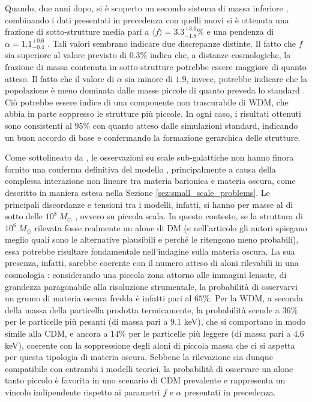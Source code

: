 Quando, due anni dopo, si è scoperto un secondo sistema di massa inferiore \parencite{Vegetti2012}, combinando i dati presentati in precedenza con quelli nuovi si è ottenuta una frazione di sotto-strutture media pari a $\langle f \rangle = 3.3^{+3.6}_{-1.8} \%$  e una pendenza di  $\alpha=1.1^{+0.6}_{-0.4}$ . Tali valori sembrano indicare due discrepanze distinte. Il fatto che $f$ sia superiore al valore previsto di $0.3\%$ indica che, a distanze cosmologiche, la frazione di massa contenuta in sotto-strutture potrebbe essere maggiore di quanto atteso. Il fatto che il valore di $\alpha$ sia minore di $1.9$, invece, potrebbe indicare che la popolazione è meno dominata dalle masse piccole di quanto preveda lo standard \LCDM. Ciò potrebbe essere indice di una componente non trascurabile di WDM, che abbia in parte soppresso le strutture più piccole. In ogni caso, i risultati ottenuti sono consistenti al 95\% con quanto atteso dalle simulazioni standard, indicando un buon accordo di base e confermando la formazione gerarchica delle strutture.

Come sottolineato da \textcite{Powell2025}, le osservazioni su scale sub-galattiche non hanno finora fornito una conferma definitiva del modello \LCDM, principalmente a causa della complessa interazione non lineare tra materia barionica e materia oscura, come descritto in maniera estesa nella Sezione \ref{sez:small_scale_problems}.
Le principali discordanze e tensioni tra i modelli, infatti, si hanno per masse al di sotto delle $10^8\ M_\odot$ , ovvero su piccola scala. In questo contesto, se la struttura di $10^6\ M_\odot$ rilevata fosse realmente un alone di DM (e nell'articolo gli autori spiegano meglio quali sono le alternative plausibili e perché le ritengono meno probabili), essa potrebbe risultare fondamentale nell'indagine sulla materia oscura.
La sua presenza, infatti, sarebbe coerente con il numero atteso di aloni rilevabili in una cosmologia \LCDM: considerando una piccola zona attorno alle immagini lensate, di grandezza paragonabile alla risoluzione strumentale, la probabilità di osservarvi un grumo di materia oscura fredda è infatti pari al $65\%$. Per la WDM, a seconda della massa della particella prodotta termicamente, la probabilità scende a $36\%$ per le particelle più pesanti (di massa pari a $9.1$ keV), che si comportano in modo simile alla CDM, e ancora a $14\%$ per le particelle più leggere (di massa pari a $4.6$ keV), coerente con la  soppressione degli aloni di piccola massa che ci si aspetta per questa tipologia di materia oscura. Sebbene la rilevazione sia dunque compatibile con entrambi i modelli teorici, la probabilità di osservare un alone tanto piccolo è favorita in uno scenario di CDM prevalente e rappresenta un vincolo indipendente rispetto ai parametri $f$ e $\alpha $ presentati in precedenza.


